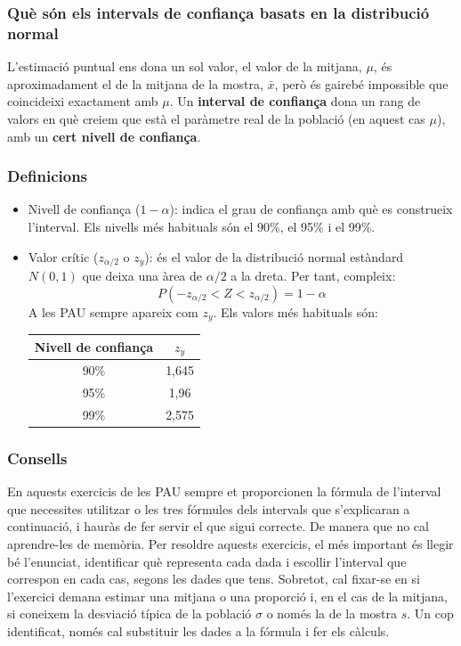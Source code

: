\subsubsection{Què són els intervals de confiança basats en la distribució normal}
L'estimació puntual ens dona un sol valor, el valor de la mitjana, $\mu$, és aproximadament el de la mitjana de la mostra, $\bar x$, però és gairebé impossible que coincideixi exactament amb $\mu$. Un \textbf{interval de confiança} dona un rang de valors en què creiem que està el paràmetre real de la població (en aquest cas $\mu$), amb un \textbf{cert nivell de confiança}.

\subsubsection{Definicions}
\begin{itemize}
\item Nivell de confiança ($1-\alpha$): indica el grau de confiança amb què es construeix l'interval. Els nivells més habituals són el 90\%, el 95\% i el 99\%.

\item Valor crític ($z_{\alpha/2}$ o $z_y$): és el valor de la distribució normal estàndard $N(0,1)$ que deixa una àrea de $\alpha/2$ a la dreta. Per tant, compleix:
$$P(-z_{\alpha/2}<Z<z_{\alpha/2})=1-\alpha$$
A les PAU sempre apareix com $z_y$. Els valors més habituals són:

\begin{center}
\begin{tabular}{c|c}
    Nivell de confiança & $z_y$ \\
    \hline
    90\% & 1,645 \\
    95\% & 1,96 \\
    99\% & 2,575
\end{tabular}
\end{center}
\end{itemize}

\subsubsection{Consells}
En aquests exercicis de les PAU sempre et proporcionen la fórmula de l'interval que necessites utilitzar o les tres fórmules dels intervals que s'explicaran a continuació, i hauràs de fer servir el que sigui correcte. De manera que no cal aprendre-les de memòria. Per resoldre aquests exercicis, el més important és llegir bé l'enunciat, identificar què representa cada dada i escollir l'interval que correspon en cada cas, segons les dades que tens. Sobretot, cal fixar-se en si l'exercici demana estimar una mitjana o una proporció i, en el cas de la mitjana, si coneixem la desviació típica de la població $\sigma$ o només la de la mostra $s$. Un cop identificat, només cal substituir les dades a la fórmula i fer els càlculs.


